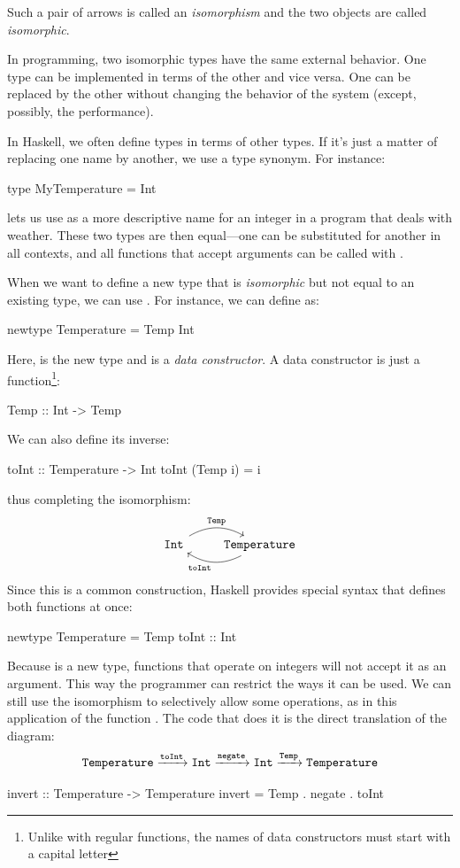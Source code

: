 \documentclass[DaoFP]{subfiles}
\begin{document}
Such a pair of arrows is called an \emph{isomorphism} and the two objects are called \emph{isomorphic}.

In programming, two isomorphic types have the same external behavior. One type can be implemented in terms of the other and vice versa. One can be replaced by the other without changing the behavior of the system (except, possibly, the performance). 

In Haskell, we often define types in terms of other types. If it's just a matter of replacing one name by another, we use a type synonym. For instance:
\begin{haskell}
type MyTemperature = Int
\end{haskell}
lets us use  as a more descriptive name for an integer in a program that deals with weather. These two types are then equal---one can be substituted for another in all contexts, and all functions that accept  arguments can be called with .

When we want to define a new type that is \emph{isomorphic} but not equal to an existing type, we can use . For instance, we can define  as:
\begin{haskell}
newtype Temperature = Temp Int
\end{haskell}
Here,  is the new type and  is a \emph{data constructor}. A data constructor is just a function\footnote{Unlike with regular functions, the names of data constructors must start with a capital letter}:
\begin{haskell}
Temp :: Int -> Temp
\end{haskell}
We can also define its inverse:
\begin{haskell}
toInt :: Temperature -> Int
toInt (Temp i) = i
\end{haskell}
thus completing the isomorphism:
\[
 \begin{tikzcd}
 \hask{Int}
 \arrow[r, bend left, "\hask{Temp}"]
 & \hask{Temperature}
 \arrow[l, bend left, "\hask{toInt}"]
 \end{tikzcd}
\]
Since this is a common construction, Haskell provides special syntax that defines both functions at once:
\begin{haskell}
newtype Temperature = Temp { toInt :: Int}
\end{haskell}

Because  is a new type, functions that operate on integers will not accept it as an argument. This way the programmer can restrict the ways it can be used. We can still use the isomorphism to selectively allow some operations, as in this application of the function . The code that does it is the direct translation of the diagram:
\[ \hask{Temperature} \xrightarrow{\hask{toInt}} \hask{Int} \xrightarrow{\hask{negate}} \hask{Int} \xrightarrow{\hask{Temp}} \hask{Temperature} \]
\begin{haskell}
invert :: Temperature -> Temperature
invert = Temp . negate . toInt
\end{haskell}
\end{document}
